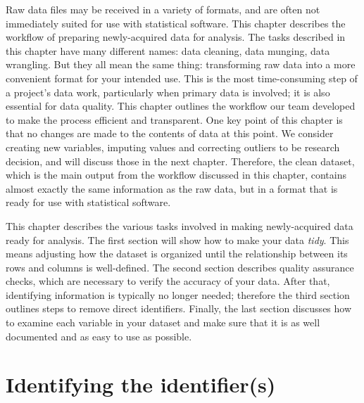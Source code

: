 
\begin{fullwidth}

Raw data files may be received in a variety of formats, 
and are often not immediately suited for use with statistical software.
This chapter describes the workflow of preparing newly-acquired data for analysis.
The tasks described in this chapter have many different names:
data cleaning, data munging, data wrangling.
But they all mean the same thing:
transforming raw data into a more convenient format for your intended use.
This is the most time-consuming step of a project's data work, 
particularly when primary data is involved;
it is also essential for data quality. 
This chapter outlines the workflow our team developed to make the process efficient and transparent.
One key point of this chapter is that no changes are made to the contents of data at this point.
We consider creating new variables, imputing values and correcting outliers
to be research decision, and will discuss those in the next chapter. 
Therefore, the clean dataset,
which is the main output from the workflow discussed in this chapter,
contains almost exactly the same information as the raw data,
but in a format that is ready for use with statistical software. 

This chapter describes the various tasks involved in making newly-acquired data ready for analysis.
The first section will show how to make your data \textit{tidy}.
This means adjusting how the dataset is organized 
until the relationship between its rows and columns is well-defined.
The second section describes quality assurance checks, 
which are necessary to verify the accuracy of your data.
After that, identifying information is typically no longer needed;
therefore the third section outlines steps to remove direct identifiers.
Finally, the last section discusses how to examine each variable in your dataset and 
make sure that it is as well documented and as easy to use as possible.

\end{fullwidth}



\section{Identifying the identifier(s)}


